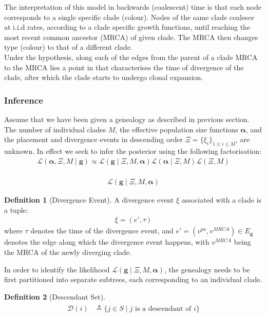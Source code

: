 \documentclass{ieeeaccess}
\theoremstyle{definition}
\newtheorem{definition}{Definition}[section]
\begin{document}
The interpretation of this model in backwards (coalescent) time is that each node corresponds to a single specific clade (colour). Nodes of the same clade coalesce at i.i.d rates, according to a clade specific growth functions, until reaching the most recent common ancestor (MRCA) of given clade. The MRCA then changes type (colour) to that of a different clade. \\
Under the hypothesis, along each of the edges from the parent of a clade MRCA to the MRCA lies a point in that characterises the time of divergence of the clade, after which the clade starts to undergo clonal expansion.
\subsubsection{Inference}
Assume that we have been given a genealogy as described in previous section. The number of individual clades $M$, the effective population size functions $\mathbf{\alpha}$, and the placement and divergence events in descending order $\Xi =\{\xi_i\}_{1\leq i\leq M}$, are unknown. In effect we seek to infer the posterior using the following factorisation:
\begin{gather}
\mathcal{L}(\mathbf{\alpha}, \Xi, M\mid\mathbf{g}) \propto 
\mathcal{L}(\mathbf{g}\mid \Xi, M, \mathbf{\alpha})\mathcal{L}(\mathbf{\alpha}\mid\Xi,M)\mathcal{L}(\Xi,M)
\end{gather}\\
\begin{gather}
\mathcal{L}(\mathbf{g}\mid \Xi, M, \mathbf{\alpha})
\end{gather}
\begin{definition}[Divergence Event] A divergence event $\xi$ associated with a clade is a tuple:
\begin{gather}
\xi=\left(e', \tau\right)
\end{gather}
where $\tau$ denotes the time of the divergence event, and $e' = (v^{pa}, v^{MRCA}) \in E_{\mathbf{g}}$ denotes the edge along which the divergence event happens, with $v^{MRCA}$ being the MRCA of the newly diverging clade.
\end{definition}
In order to identify the likelihood $\mathcal{L}(\mathbf{g}\mid \Xi, M, \mathbf{\alpha})$, the genealogy needs to be first partitioned into separate subtrees, each corresponding to an individual clade.
\begin{definition}[Descendant Set]
\begin{gather}
\begin{aligned}
\mathcal{D}(i) &\triangleq \{j\in S\mid j \text{ is a descendant of } i\}
\end{aligned}
\end{gather} 
\end{definition}
\end{document}
